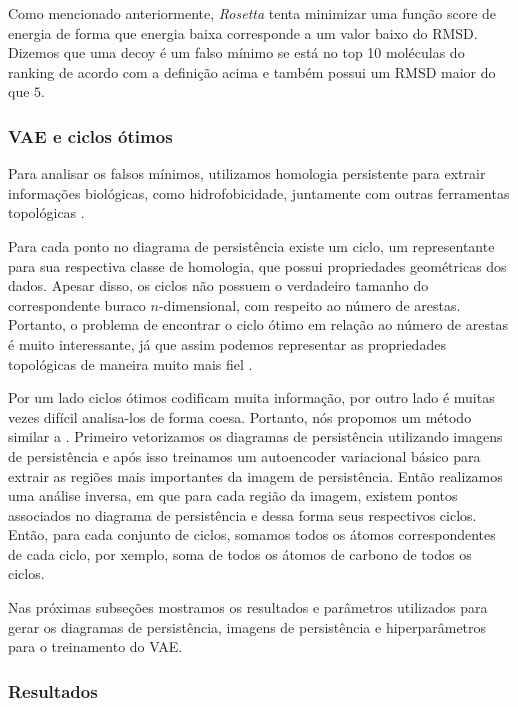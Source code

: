 Como mencionado anteriormente, \textit{Rosetta} tenta minimizar uma função score de energia de forma
que energia baixa corresponde a um valor baixo do RMSD. Dizemos que uma decoy é um falso mínimo
se está no top 10 moléculas do ranking de acordo com a definição acima e também possui um RMSD maior
do que $5$.

\subsubsection{VAE e ciclos ótimos}

Para analisar os falsos mínimos, utilizamos homologia persistente \cite{Edelsbrunner2002} para extrair
informações biológicas, como hidrofobicidade, juntamente com outras ferramentas topológicas \cite{Cang2017}.

Para cada ponto no diagrama de persistência existe um ciclo, um representante para sua respectiva classe
de homologia, que possui propriedades geométricas dos dados. Apesar disso, os ciclos não possuem o
verdadeiro tamanho do correspondente buraco $n$-dimensional, com respeito ao número de arestas. Portanto,
o problema de encontrar o ciclo ótimo em relação ao número de arestas é muito interessante, já que assim
podemos representar as propriedades topológicas de maneira muito mais fiel \cite{Escolar2015}.

Por um lado ciclos ótimos codificam muita informação, por outro lado é muitas vezes difícil analisa-los
de forma coesa. Portanto, nós propomos um método similar a \cite{Obayashi2018}. Primeiro vetorizamos
os diagramas de persistência utilizando imagens de persistência \cite{Adams2017} e após isso treinamos
um autoencoder variacional básico \cite{kingma2013} para extrair as regiões mais importantes
da imagem de persistência. Então realizamos uma análise inversa, em que para
cada região da imagem, existem pontos associados no diagrama de persistência e dessa forma seus
respectivos ciclos. Então, para cada conjunto de ciclos, somamos todos os átomos correspondentes de
cada ciclo, por xemplo, soma de todos os átomos de carbono de todos os ciclos. 

Nas próximas subseções
mostramos os resultados e parâmetros utilizados para gerar os diagramas de persistência, imagens
de persistência e hiperparâmetros para o treinamento do VAE.

\subsubsection{Resultados}

